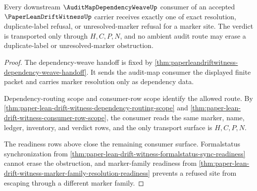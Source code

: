 \begin{theorem}
\label{thm:paper-lean-drift-witness-audit-map-consumer-totality}
Every downstream $\AuditMapDependencyWeaveUp$ consumer of an accepted $\PaperLeanDriftWitnessUp$ carrier receives exactly one of exact resolution, duplicate-label refusal, or unresolved-marker refusal for a marker site. The verdict is transported only through $H,C,P,N$, and no ambient audit route may erase a duplicate-label or unresolved-marker obstruction.
\end{theorem}
\begin{proof}
The dependency-weave handoff is fixed by \autoref{thm:paperleandriftwitness-dependency-weave-handoff}. It sends the audit-map consumer the displayed finite packet and carries marker resolution only as dependency data.

Dependency-routing scope and consumer-row scope identify the allowed route. By \autoref{thm:paper-lean-drift-witness-dependency-routing-scope} and \autoref{thm:paper-lean-drift-witness-consumer-row-scope}, the consumer reads the same marker, name, ledger, inventory, and verdict rows, and the only transport surface is $H,C,P,N$.

The readiness rows above close the remaining consumer surface. Formalstatus synchronization from \autoref{thm:paper-lean-drift-witness-formalstatus-sync-readiness} cannot erase the obstruction, and marker-family readiness from \autoref{thm:paper-lean-drift-witness-marker-family-resolution-readiness} prevents a refused site from escaping through a different marker family.
\end{proof}

